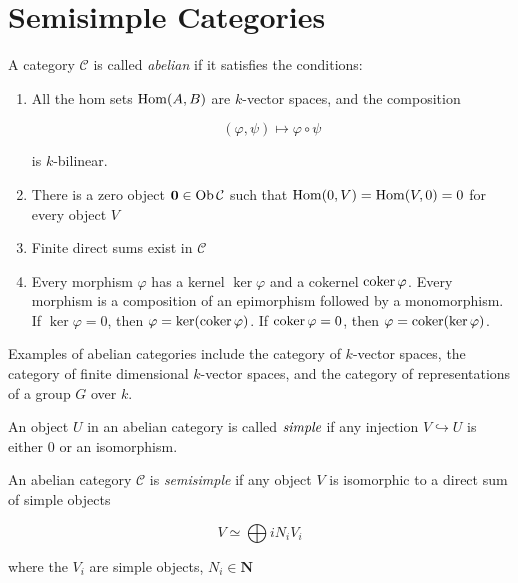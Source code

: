 \section{Semisimple Categories}
\begin{defn}
    A category $\mathcal{C}$ is called \emph{abelian} if it satisfies the conditions:

    \begin{enumerate}
    \renewcommand{\labelenumi}{\roman{enumi})}
        \item All the hom sets $\operatorname{Hom}(A,B)$ are $k$-vector spaces, and the composition
            
            \begin{equation}
                (\varphi, \psi) \mapsto \varphi \circ \psi
            \end{equation}

            is $k$-bilinear.
        \item There is a zero object $\mathbf{0} \in \operatorname{Ob} \mathcal{C}$ such that
            $\operatorname{Hom}(0,V) = \operatorname{Hom}(V,0) = 0$ for every object $V$
        \item Finite direct sums exist in $\mathcal{C}$
        \item Every morphism $\varphi$ has a kernel $\ker \varphi$ and a
            cokernel $\operatorname{coker} \varphi$. Every morphism is a composition of an
            epimorphism followed by a monomorphism. If $\ker \varphi = 0$, then
            $\varphi = \ker(\operatorname{coker} \varphi)$. If $\operatorname{coker} \varphi = 0$, then
            $\varphi = \operatorname{coker}(\ker \varphi)$.
    \end{enumerate}

    Examples of abelian categories include the category of $k$-vector spaces,
    the category of finite dimensional $k$-vector spaces, and the category of
    representations of a group $G$ over $k$.

\end{defn}

\begin{defn}
    An object $U$ in an abelian category is called $\emph{simple}$ if any
    injection $V \hookrightarrow U$ is either $0$ or an isomorphism.
\end{defn}

\begin{defn}
    An abelian category $\mathcal{C}$ is \emph{semisimple} if any object $V$ is isomorphic to a direct sum of simple objects

    \begin{equation}
        V \simeq \bigoplus{i} N_i V_i
    \end{equation}

    where the $V_i$ are simple objects, $N_i \in \mathbf{N}$

\end{defn}


